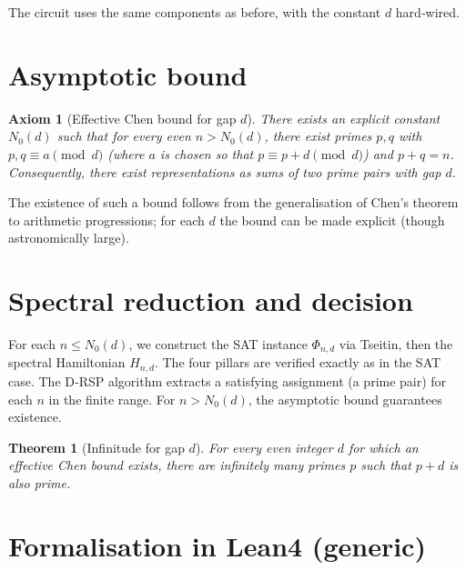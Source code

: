 \documentclass[11pt,a4paper]{article}
\newtheorem{theorem}{Theorem}[section]
\newtheorem{axiom}{Axiom}[section]
\begin{document}
The circuit uses the same components as before, with the constant \(d\) hard‑wired.

\section{Asymptotic bound}

\begin{axiom}[Effective Chen bound for gap \(d\)]
There exists an explicit constant \(N_0(d)\) such that for every even \(n > N_0(d)\), there exist primes \(p,q\) with \(p,q\equiv a\pmod{d}\) (where \(a\) is chosen so that \(p\equiv p+d\pmod{d}\)) and \(p+q=n\). Consequently, there exist representations as sums of two prime pairs with gap \(d\).
\end{axiom}

The existence of such a bound follows from the generalisation of Chen's theorem to arithmetic progressions; for each \(d\) the bound can be made explicit (though astronomically large).

\section{Spectral reduction and decision}

For each \(n \le N_0(d)\), we construct the SAT instance \(\Phi_{n,d}\) via Tseitin, then the spectral Hamiltonian \(H_{n,d}\). The four pillars are verified exactly as in the SAT case. The D‑RSP algorithm extracts a satisfying assignment (a prime pair) for each \(n\) in the finite range. For \(n > N_0(d)\), the asymptotic bound guarantees existence.

\begin{theorem}[Infinitude for gap \(d\)]
For every even integer \(d\) for which an effective Chen bound exists, there are infinitely many primes \(p\) such that \(p+d\) is also prime.
\end{theorem}

\section{Formalisation in Lean4 (generic)}
\end{document}
